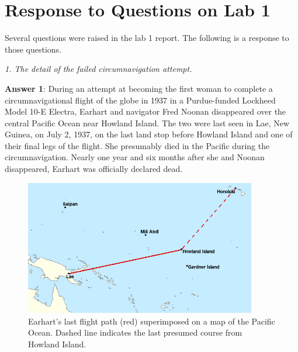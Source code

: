 \section{Response to Questions on Lab 1}

Several questions were raised in the lab 1 report. The following is a response to those questions.

\vspace{1em}
\textit{1. The detail of the failed circumnavigation attempt.}
\vspace{1em}

\textbf{Answer 1}: 
During an attempt at becoming the first woman to complete a 
circumnavigational flight of the globe in 1937 in a Purdue-funded 
Lockheed Model 10-E Electra, Earhart and navigator Fred Noonan 
disappeared over the central Pacific Ocean near Howland Island. 
The two were last seen in Lae, New Guinea, on July 2, 1937, on the 
last land stop before Howland Island and one of their final legs of the flight. 
She presumably died in the Pacific during the circumnavigation.
Nearly one year and six months after she and Noonan disappeared, Earhart was officially declared dead. 

\begin{figure}[!htp]
    \centering
    \includegraphics[width=0.9\textwidth]{images/Earhart_locations.png}
    \caption{Earhart's last flight path (red) superimposed on a map of the Pacific Ocean. Dashed line indicates the last presumed course from Howland Island.}
\end{figure}

